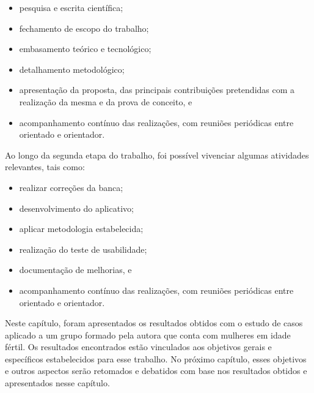 \begin{itemize}
    \item pesquisa e escrita científica;
    \item fechamento de escopo do trabalho;
    \item embasamento teórico e tecnológico;
    \item detalhamento metodológico;
    \item apresentação da proposta, das principais contribuições pretendidas com a realização da mesma e da prova de conceito, e
    \item acompanhamento contínuo das realizações, com reuniões periódicas entre orientado e orientador.
\end{itemize}

Ao longo da segunda etapa do trabalho, foi possível vivenciar algumas atividades relevantes, tais como:

\begin{itemize}
    \item realizar correções da banca;
    \item desenvolvimento do aplicativo;
    \item aplicar metodologia estabelecida;
    \item realização do teste de usabilidade;
    \item documentação de melhorias, e
    \item acompanhamento contínuo das realizações, com reuniões periódicas entre orientado e orientador.
\end{itemize}

Neste capítulo, foram apresentados os resultados obtidos com o estudo de casos aplicado a um grupo formado pela autora que conta com 
mulheres em idade fértil. Os resultados encontrados
estão vinculados aos objetivos gerais e específicos estabelecidos para esse trabalho. No próximo capítulo,
esses objetivos e outros aspectos serão retomados e debatidos com base nos resultados
obtidos e apresentados nesse capítulo.